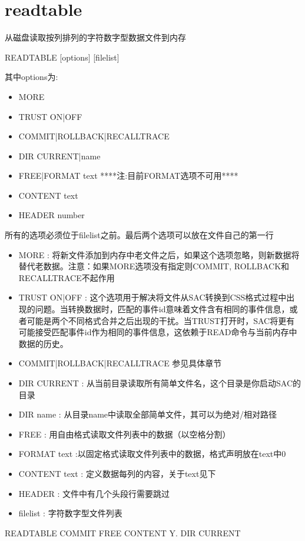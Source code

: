 \section{readtable}
\label{cmd:readtable}

从磁盘读取按列排列的字符数字型数据文件到内存

READTABLE [options] [filelist]

其中options为:
\begin{itemize}
\item MORE
\item TRUST ON|OFF
\item COMMIT|ROLLBACK|RECALLTRACE
\item DIR CURRENT|name  
\item FREE|FORMAT text ****注:目前FORMAT选项不可用****
\item CONTENT text
\item HEADER number
\end{itemize}
所有的选项必须位于filelist之前。最后两个选项可以放在文件自己的第一行

\begin{itemize}
\item MORE : 将新文件添加到内存中老文件之后，如果这个选项忽略，则新数据将替代老数据。注意：如果MORE选项没有指定则COMMIT, ROLLBACK和RECALLTRACE不起作用 
\item TRUST ON|OFF : 这个选项用于解决将文件从SAC转换到CSS格式过程中出现的问题。当转换数据时，匹配的事件id意味着文件含有相同的事件信息，或者可能是两个不同格式合并之后出现的干扰。当TRUST打开时，SAC将更有可能接受匹配事件id作为相同的事件信息，这依赖于READ命令与当前内存中数据的历史。
\item COMMIT|ROLLBACK|RECALLTRACE 参见具体章节 
\item DIR CURRENT : 从当前目录读取所有简单文件名，这个目录是你启动SAC的目录 
\item DIR name : 从目录name中读取全部简单文件，其可以为绝对/相对路径 
\item FREE : 用自由格式读取文件列表中的数据（以空格分割）
\item FORMAT text :以固定格式读取文件列表中的数据，格式声明放在text中0 
\item CONTENT text : 定义数据每列的内容，关于text见下 
\item HEADER : 文件中有几个头段行需要跳过 
\item filelist : 字符数字型文件列表
\end{itemize}

READTABLE COMMIT FREE CONTENT Y. DIR CURRENT

